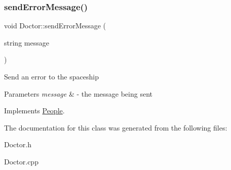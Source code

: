 \subsubsection{\texorpdfstring{send\+Error\+Message()}{sendErrorMessage()}}
{\footnotesize\ttfamily void Doctor\+::send\+Error\+Message (\begin{DoxyParamCaption}\item[{string}]{message }\end{DoxyParamCaption})\hspace{0.3cm}{\ttfamily [virtual]}}

Send an error to the spaceship 
\begin{DoxyParams}{Parameters}
{\em message} & -\/ the message being sent \\
\hline
\end{DoxyParams}


Implements \hyperlink{classPeople_a572a35170f61d1848eb04b65baafb057}{People}.



The documentation for this class was generated from the following files\+:\begin{DoxyCompactItemize}
\item 
Doctor.\+h\item 
Doctor.\+cpp\end{DoxyCompactItemize}
